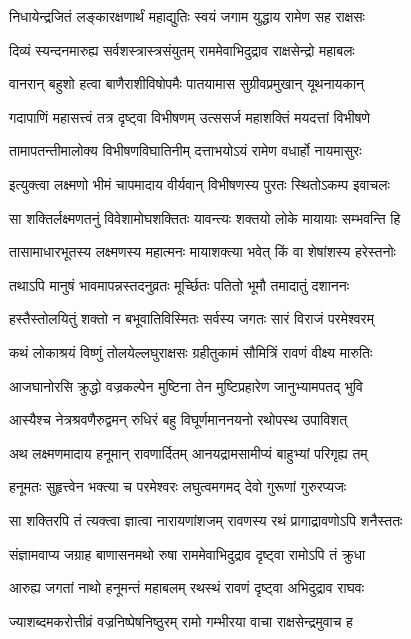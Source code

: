 \twolineshloka
{निधायेन्द्रजितं लङ्कारक्षणार्थं महाद्युतिः}
{स्वयं जगाम युद्धाय रामेण सह राक्षसः} %

\twolineshloka
{दिव्यं स्यन्दनमारुह्य सर्वशस्त्रास्त्रसंयुतम्}
{राममेवाभिदुद्राव राक्षसेन्द्रो महाबलः} %

\twolineshloka
{वानरान् बहुशो हत्वा बाणैराशीविषोपमैः}
{पातयामास सुग्रीवप्रमुखान् यूथनायकान्} %

\twolineshloka
{गदापाणिं महासत्त्वं तत्र दृष्ट्वा विभीषणम्}
{उत्ससर्ज महाशक्तिं मयदत्तां विभीषणे} %

\twolineshloka
{तामापतन्तीमालोक्य विभीषणविघातिनीम्}
{दत्ताभयोऽयं रामेण वधार्हो नायमासुरः} %

\twolineshloka
{इत्युक्त्वा लक्ष्मणो भीमं चापमादाय वीर्यवान्}
{विभीषणस्य पुरतः स्थितोऽकम्प इवाचलः} %

\twolineshloka
{सा शक्तिर्लक्ष्मणतनुं विवेशामोघशक्तितः}
{यावन्त्यः शक्तयो लोके मायायाः सम्भवन्ति हि} %

\twolineshloka
{तासामाधारभूतस्य लक्ष्मणस्य महात्मनः}
{मायाशक्त्या भवेत् किं वा शेषांशस्य हरेस्तनोः} %

\twolineshloka
{तथाऽपि मानुषं भावमापन्नस्तदनुव्रतः}
{मूर्च्छितः पतितो भूमौ तमादातुं दशाननः} %

\twolineshloka
{हस्तैस्तोलयितुं शक्तो न बभूवातिविस्मितः}
{सर्वस्य जगतः सारं विराजं परमेश्वरम्} %

\twolineshloka
{कथं लोकाश्रयं विष्णुं तोलयेल्लघुराक्षसः}
{ग्रहीतुकामं सौमित्रिं रावणं वीक्ष्य मारुतिः} %

\twolineshloka
{आजघानोरसि क्रुद्धो वज्रकल्पेन मुष्टिना}
{तेन मुष्टिप्रहारेण जानुभ्यामपतद् भुवि} %

\twolineshloka
{आस्यैश्च नेत्रश्रवणैरुद्वमन् रुधिरं बहु}
{विघूर्णमाननयनो रथोपस्थ उपाविशत्} %

\twolineshloka
{अथ लक्ष्मणमादाय हनूमान् रावणार्दितम्}
{आनयद्रामसामीप्यं बाहुभ्यां परिगृह्य तम्} %

\twolineshloka
{हनूमतः सुहृत्त्वेन भक्त्या च परमेश्वरः}
{लघुत्वमगमद् देवो गुरूणां गुरुरप्यजः} %

\twolineshloka
{सा शक्तिरपि तं त्यक्त्वा ज्ञात्वा नारायणांशजम्}
{रावणस्य रथं प्रागाद्रावणोऽपि शनैस्ततः} %

\twolineshloka
{संज्ञामवाप्य जग्राह बाणासनमथो रुषा}
{राममेवाभिदुद्राव दृष्ट्वा रामोऽपि तं क्रुधा} %

\twolineshloka
{आरुह्य जगतां नाथो हनूमन्तं महाबलम्}
{रथस्थं रावणं दृष्ट्वा अभिदुद्राव राघवः} %

\twolineshloka
{ज्याशब्दमकरोत्तीव्रं वज्रनिष्पेषनिष्ठुरम्}
{रामो गम्भीरया वाचा राक्षसेन्द्रमुवाच ह} %

